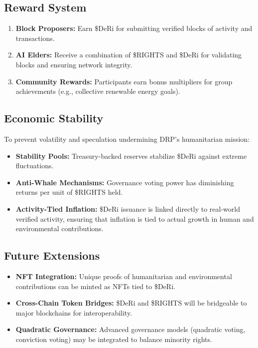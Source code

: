 \documentclass[11pt,a4paper]{article}
\begin{document}
\subsection{Reward System}
\begin{enumerate}
    \item \textbf{Block Proposers:} Earn \$DeRi for submitting verified blocks of activity and transactions.
    \item \textbf{AI Elders:} Receive a combination of \$RIGHTS and \$DeRi for validating blocks and ensuring network integrity.
    \item \textbf{Community Rewards:} Participants earn bonus multipliers for group achievements (e.g., collective renewable energy goals).
\end{enumerate}

\subsection{Economic Stability}
To prevent volatility and speculation undermining DRP’s humanitarian mission:
\begin{itemize}
    \item \textbf{Stability Pools:} Treasury-backed reserves stabilize \$DeRi against extreme fluctuations.
    \item \textbf{Anti-Whale Mechanisms:} Governance voting power has diminishing returns per unit of \$RIGHTS held.
    \item \textbf{Activity-Tied Inflation:} \$DeRi issuance is linked directly to real-world verified activity, ensuring that inflation is tied to actual growth in human and environmental contributions.
\end{itemize}

\subsection{Future Extensions}
\begin{itemize}
    \item \textbf{NFT Integration:} Unique proofs of humanitarian and environmental contributions can be minted as NFTs tied to \$DeRi.
    \item \textbf{Cross-Chain Token Bridges:} \$DeRi and \$RIGHTS will be bridgeable to major blockchains for interoperability.
    \item \textbf{Quadratic Governance:} Advanced governance models (quadratic voting, conviction voting) may be integrated to balance minority rights.
\end{itemize}
\end{document}
